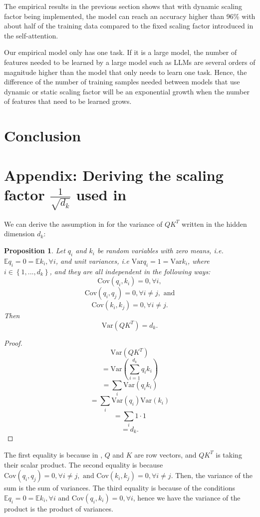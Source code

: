 \documentclass{article}
\theoremstyle{plain}
\theoremstyle{plain} %
\newtheorem{proposition}{Proposition}
\theoremstyle{definition}  %
\theoremstyle{remark}  %
\theoremstyle{plain}
\begin{document}
The empirical results in the previous section shows that with dynamic scaling factor being implemented, the model can reach an accuracy higher than 96\% with about half of the training data compared to the fixed scaling factor introduced in the self-attention.

Our empirical model only has one task. If it is a large model, the number of features needed to be learned by a large model such as LLMs are several orders of magnitude higher than the model that only needs to learn one task. Hence, the difference of the number of training samples needed between models that use dynamic or static scaling factor will be an exponential growth when the number of features that need to be learned grows. 
\section{Conclusion}

\section{Appendix: Deriving the scaling factor $\frac{1}{\sqrt{d_k}}$ used in \cite{vaswani2017attention}}


We can derive the assumption in \cite{vaswani2017attention} for the variance of $QK^T$ written in the hidden dimension $d_k$:
\begin{proposition}
Let $q_i$ and $k_i$ be random variables with zero means, i.e. $\mathbb{E} q_i=0=\mathbb{E} k_i, \forall i$, and unit variances, i.e $\text{Var} q_i=1=\text{Var}k_i$, where $i\in\left\lbrace 1,...,d_k\right\rbrace$, and they are all independent in the following ways:
$$
\text{Cov}\left( q_i,k_i\right)=0, \forall i,
$$
$$
\text{Cov}\left( q_i,q_j\right)=0, \forall i\neq j, \text{ and}
$$
$$
\text{Cov}\left( k_i,k_j\right)=0, \forall i\neq j.
$$
Then
$$
\text{Var}\left( QK^T\right)=d_k.
$$
\end{proposition}
 
\begin{proof}
$$
\text{Var}\left( QK^T\right)
$$
$$
=\text{Var}\left( \sum\limits_{i=1}^{d_k}q_ik_i\right)
$$
$$
=\sum\limits_i \text{Var}\left( q_ik_i\right)
$$
$$
=\sum\limits_i \text{Var}\left( q_i\right) \text{Var}\left( k_i\right)
$$
$$
=\sum\limits_i 1\cdot 1
$$
$$
=d_k.
$$
\end{proof}
The first equality is because in \cite{vaswani2017attention}, $Q$ and $K$ are row vectors, and $QK^T$ is taking their scalar product. The second equality is because $\text{Cov}\left( q_i,q_j\right)=0, \forall i\neq j, \text{ and } \text{Cov}\left( k_i,k_j\right)=0, \forall i\neq j.$ Then, the variance of the sum is the sum of variances. The third equality is because of the conditions $\mathbb{E} q_i=0=\mathbb{E} k_i, \forall i$ and $\text{Cov}\left( q_i,k_i\right)=0, \forall i$, hence we have the variance of the product is the product of variances.
\end{document}
